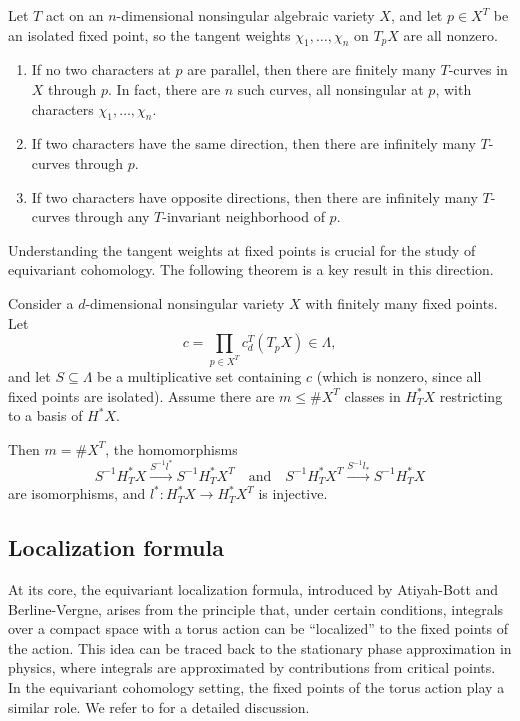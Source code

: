 \begin{proposition}
	Let \( T \) act on an \( n \)-dimensional nonsingular algebraic variety \( X \), and let \( p \in X^T \) be an isolated fixed point, so the tangent weights \( \chi_1, \dots, \chi_n \) on \( T_p X \) are all nonzero.
	\begin{enumerate}
		\item If no two characters at \( p \) are parallel, then there are finitely many \( T \)-curves in \( X \) through \( p \). In fact, there are \( n \) such curves, all nonsingular at \( p \), with characters \( \chi_1, \dots, \chi_n \).
		\item If two characters have the same direction, then there are infinitely many \( T \)-curves through \( p \).
		\item If two characters have opposite directions, then there are infinitely many \( T \)-curves through any \( T \)-invariant neighborhood of \( p \).
	\end{enumerate}
\end{proposition}
Understanding the tangent weights at fixed points is crucial for the study of equivariant cohomology. The following theorem is a key result in this direction.
\begin{theorem}
	Consider a $d$-dimensional nonsingular variety $X$ with finitely many fixed points. Let
	\[
		c = \prod_{p \in X^T} c_d^T(T_p X) \in \Lambda,
	\]
	and let $S \subseteq \Lambda$ be a multiplicative set containing $c$ (which is nonzero, since all fixed points are isolated). Assume there are $m \leq \#X^T$ classes in $H^*_T X$ restricting to a basis of $H^* X$.

	Then $m = \#X^T$, the homomorphisms
	\[
		S^{-1} H^*_T X \xrightarrow{S^{-1} l^*} S^{-1} H^*_T X^T \quad \text{and} \quad S^{-1} H^*_T X^T \xrightarrow{S^{-1} l_*} S^{-1} H^*_T X
	\]
	are isomorphisms, and $l^*: H^*_T X \to H^*_T X^T$ is injective.
\end{theorem}

\subsection{Localization formula}
At its core, the equivariant localization formula, introduced by Atiyah-Bott and Berline-Vergne, arises from the principle that, under certain conditions, integrals over a compact space with a torus action can be “localized” to the fixed points of the action. This idea can be traced back to the stationary phase approximation in physics, where integrals are approximated by contributions from critical points. In the equivariant cohomology setting, the fixed points of the torus action play a similar role. We refer to \cite{fulton-anderson} for a detailed discussion.

